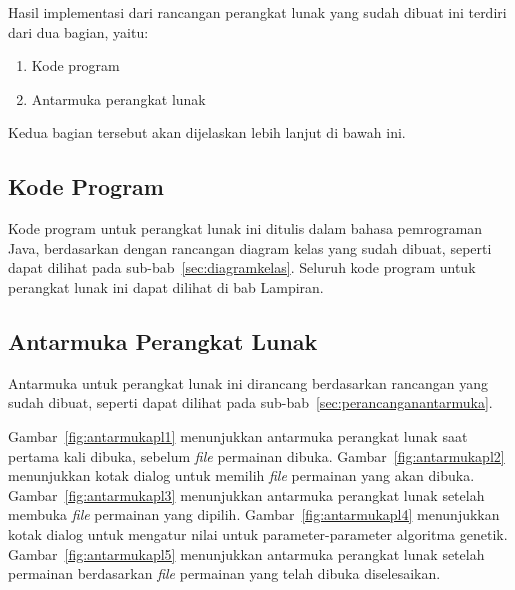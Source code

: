 Hasil implementasi dari rancangan perangkat lunak yang sudah dibuat ini terdiri dari dua bagian, yaitu:

\begin{enumerate}
\item Kode program
\item Antarmuka perangkat lunak
\end{enumerate}

Kedua bagian tersebut akan dijelaskan lebih lanjut di bawah ini.

\subsection{Kode Program}
\label{sec:kodeprogram}

Kode program untuk perangkat lunak ini ditulis dalam bahasa pemrograman Java, berdasarkan dengan rancangan diagram kelas yang sudah dibuat, seperti dapat dilihat pada sub-bab~\ref{sec:diagramkelas}. Seluruh kode program untuk perangkat lunak ini dapat dilihat di bab Lampiran.

\subsection{Antarmuka Perangkat Lunak}
\label{sec:antarmukapl}

Antarmuka untuk perangkat lunak ini dirancang berdasarkan rancangan yang sudah dibuat, seperti dapat dilihat pada sub-bab~\ref{sec:perancanganantarmuka}.

Gambar~\ref{fig:antarmukapl1} menunjukkan antarmuka perangkat lunak saat pertama kali dibuka, sebelum \textit{file} permainan dibuka. Gambar~\ref{fig:antarmukapl2} menunjukkan kotak dialog untuk memilih \textit{file} permainan yang akan dibuka. Gambar~\ref{fig:antarmukapl3} menunjukkan antarmuka perangkat lunak setelah membuka \textit{file} permainan yang dipilih. Gambar~\ref{fig:antarmukapl4} menunjukkan kotak dialog untuk mengatur nilai untuk parameter-parameter algoritma genetik. Gambar~\ref{fig:antarmukapl5} menunjukkan antarmuka perangkat lunak setelah permainan berdasarkan \textit{file} permainan yang telah dibuka diselesaikan.

